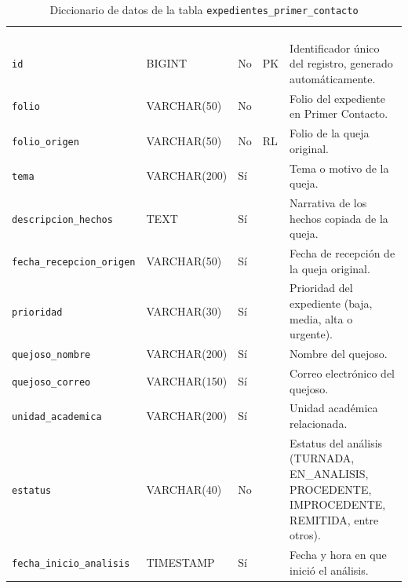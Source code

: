 \footnotesize
\renewcommand{\arraystretch}{1.15}
\setlength{\tabcolsep}{4pt}
\begin{longtable}{|L{3.9cm}|L{2.4cm}|L{0.9cm}|L{1.2cm}|L{6.6cm}|}
	\hiderowcolors\caption{Diccionario de datos de la tabla \texttt{expedientes\_primer\_contacto}}
	\label{tab:cap3_dic_expedientes_primer_contacto} \\ \showrowcolors
	\hline
	 &  &  &  &  \\
	\hline
	\endfirsthead
	\hline
	 &  &  &  &  \\
	\hline
	\endhead
		\texttt{id} & BIGINT & No & PK & Identificador único del registro, generado automáticamente. \\ \hline
		\texttt{folio} & VARCHAR(50) & No &  & Folio del expediente en Primer Contacto. \\ \hline
		\texttt{folio\_\allowbreak{}origen} & VARCHAR(50) & No & RL & Folio de la queja original. \\ \hline
		\texttt{tema} & VARCHAR(200) & Sí &  & Tema o motivo de la queja. \\ \hline
		\texttt{descripcion\_\allowbreak{}hechos} & TEXT & Sí &  & Narrativa de los hechos copiada de la queja. \\ \hline
		\texttt{fecha\_\allowbreak{}recepcion\_\allowbreak{}origen} & VARCHAR(50) & Sí &  & Fecha de recepción de la queja original. \\ \hline
		\texttt{prioridad} & VARCHAR(30) & Sí &  & Prioridad del expediente (baja, media, alta o urgente). \\ \hline
		\texttt{quejoso\_\allowbreak{}nombre} & VARCHAR(200) & Sí &  & Nombre del quejoso. \\ \hline
		\texttt{quejoso\_\allowbreak{}correo} & VARCHAR(150) & Sí &  & Correo electrónico del quejoso. \\ \hline
		\texttt{unidad\_\allowbreak{}academica} & VARCHAR(200) & Sí &  & Unidad académica relacionada. \\ \hline
		\texttt{estatus} & VARCHAR(40) & No &  & Estatus del análisis (TURNADA, EN\_ANALISIS, PROCEDENTE, IMPROCEDENTE, REMITIDA, entre otros). \\ \hline
		\texttt{fecha\_\allowbreak{}inicio\_\allowbreak{}analisis} & TIMESTAMP & Sí &  & Fecha y hora en que inició el análisis. \\ \hline

\end{longtable}
